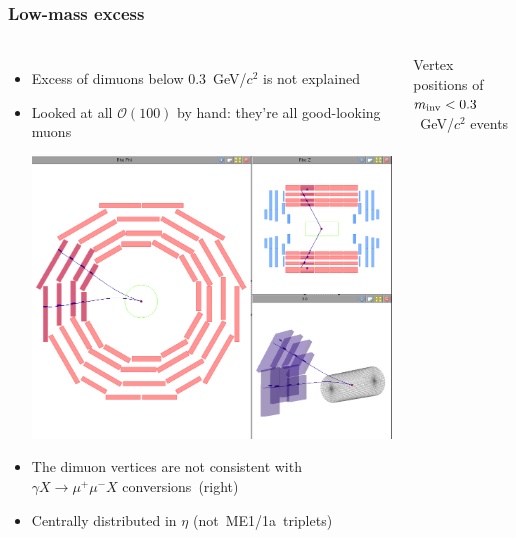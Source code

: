\documentclass[compress]{beamer}
\newcommand{\s}[1]{{\mbox{\scriptsize #1}}}
\begin{document}
\begin{frame}
\frametitle{Low-mass excess}

\begin{columns}
\begin{itemize}
\item Excess of dimuons below 0.3~GeV/$c^2$ is not explained
\item Looked at all $\mathcal{O}(100)$ by hand: they're all
  good-looking muons

\includegraphics[width=\linewidth]{low-mass_perfectly-normal_2.png}

\item The dimuon vertices are not consistent with $\gamma X \to
  \mu^+\mu^- X$ \mbox{conversions (right)\hspace{-1 cm}}

\item Centrally distributed in $\eta$ \mbox{(not ME1/1a triplets)\hspace{-2 cm}}
\end{itemize}

\begin{center}
{\scriptsize Vertex positions of $m_\s{inv} < 0.3$~GeV/$c^2$ events}


\end{center}
\end{columns}
\end{frame}
\end{document}
